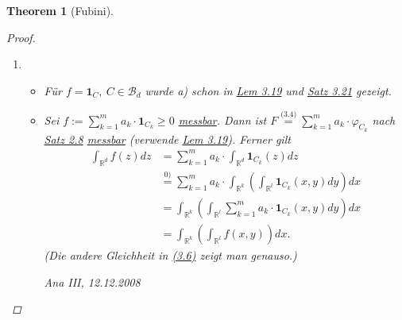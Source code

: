 \documentclass[a4paper]{report}
\newcommand{\doubleOne}{\textbf{1}}
\newcommand{\R}{\mathbb{R}}
\newcommand{\Borel}{\mathcal{B}}
\newcommand{\Bd}{\Borel_d}
\newcommand{\jlabel}[1]{\label{j_#1}}
\newcommand{\jshortlink}[1]{\jhyperref{#1}{\text{#1}}}
\newcommand{\jhyperref}[2]{\hyperref[j_#1]{#2}}
\newcommand{\jlink}[1]{\jhyperref{#1}{#1}}
\newcommand{\jspacesmall}{\vspace{4pt}}
\newcommand{\jdate}[1]{\jspacesmall\begin{center}\jlabel{#1}\tiny{Ana III, #1}\end{center}}
\theoremstyle{plain}
\newtheorem{thm}{Theorem}[chapter]
\theoremstyle{definition}
\begin{document}
{{{{\begin{thm}[Fubini]
\begin{proof}
        \begin{enumerate}
            \item 
                \begin{itemize}
                    \item[0)] Für $f=\doubleOne_C, \ C\in \Bd$ wurde a) schon in \jlink{Lem 3.19} und \jlink{Satz 3.21} gezeigt.
                    \item[1)] 
                        Sei $f:= \sum_{k=1}^m a_k\cdot \doubleOne_{C_k} \ge 0$ \jlink{messbar}. Dann ist $F \overset{\jshortlink{(3.4)}}{=} \sum_{k=1}^m a_k\cdot \varphi_{C_k}$ nach \jlink{Satz 2.8} \jlink{messbar} (verwende \jlink{Lem 3.19}). Ferner gilt
                        \begin{displaymath}
                            \begin{split}
                                \int_{\R^d} f(z)dz &= \sum_{k=1}^m a_k \cdot \int_{\R^d} \doubleOne_{C_k}(z) dz\\ 
                                                   &\overset{\text{0)}}{=} \sum_{k=1}^m a_k \cdot \int_{\R^k} \left( \int_{\R^l} \doubleOne_{C_k}(x,y)dy \right)dx\\
                                                   &= \int_{\R^k} \left( \int_{\R^l} \sum_{k=1}^m a_k \cdot \doubleOne_{C_k}(x,y)dy \right)dx\\
                                                   &=\int_{\R^k} \left( \int_{\R^l} f(x,y) \right)dx.
                            \end{split}
                        \end{displaymath}
                        (Die andere Gleichheit in \jlink{(3.6)} zeigt man genauso.)
                    
\jdate{12.12.2008}
                    

\end{itemize}
\end{enumerate}
\end{proof}
\end{thm}}}}}
\end{document}
